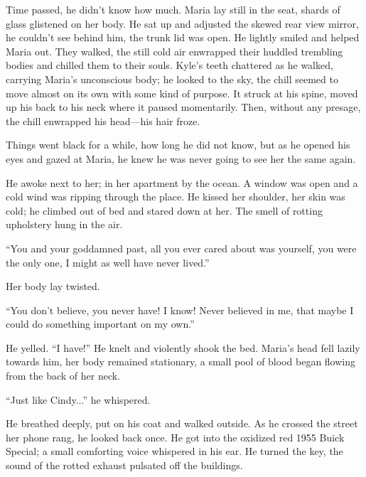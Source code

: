 \documentclass[
]{article}
\begin{document}
Time passed, he didn't know how much. Maria lay still in the seat,
shards of glass glistened on her body. He sat up and adjusted the skewed
rear view mirror, he couldn't see behind him, the trunk lid was open. He
lightly smiled and helped Maria out. They walked, the still cold air
enwrapped their huddled trembling bodies and chilled them to their
souls. Kyle's teeth chattered as he walked, carrying Maria's unconscious
body; he looked to the sky, the chill seemed to move almost on its own
with some kind of purpose. It struck at his spine, moved up his back to
his neck where it paused momentarily. Then, without any presage, the
chill enwrapped his head---his hair froze.

Things went black for a while, how long he did not know, but as he
opened his eyes and gazed at Maria, he knew he was never going to see
her the same again.

He awoke next to her; in her apartment by the ocean. A window was open
and a cold wind was ripping through the place. He kissed her shoulder,
her skin was cold; he climbed out of bed and stared down at her. The
smell of rotting upholstery hung in the air.

``You and your goddamned past, all you ever cared about was yourself,
you were the only one, I might as well have never lived.''

Her body lay twisted.

``You don't believe, you never have! I know! Never believed in me, that
maybe I could do something important on my own.''

He yelled. ``I have!'' He knelt and violently shook the bed. Maria's
head fell lazily towards him, her body remained stationary, a small pool
of blood began flowing from the back of her neck.

``Just like Cindy...'' he whispered.

He breathed deeply, put on his coat and walked outside. As he crossed
the street her phone rang, he looked back once. He got into the oxidized
red 1955 Buick Special; a small comforting voice whispered in his ear.
He turned the key, the sound of the rotted exhaust pulsated off the
buildings.
\end{document}
